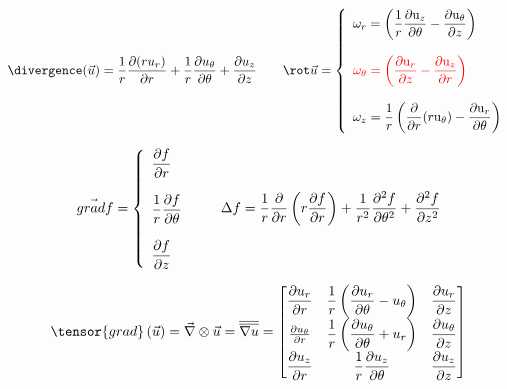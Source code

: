 
$$
\divergence (\vec{u}) = \frac{1}{r} \dpa{(r u_r)}{r} + \frac{1}{r} \dpa{u_{\theta}}{\theta} + \dpa{u_z}{z}\qquad 
\rot \vec{u} =  \left\{ 
\begin{array}{l} 
\displaystyle \omega_r = \left(\frac{1}{r}\frac{\partial \mathrm{u}_z}{\partial \theta} - \frac{\partial \mathrm{u}_\theta}{\partial z}\right) \\ \\
\color{red}{
\displaystyle \omega_\theta = \left(\frac{\partial \mathrm{u}_r}{\partial z} - \frac{\partial \mathrm{u}_z}{\partial r}\right) }
\\ \\
\displaystyle \omega_z = \frac{1}{r}\left(\frac{\partial}{\partial r}(r \mathrm{u}_\theta) - \frac{\partial \mathrm{u}_r}{\partial \theta}\right)\\
\end{array}
\right.
$$

$$
\vec{grad} f = 
 \left\{ 
\begin{array}{l} 
\displaystyle \frac{\partial f}{\partial r} \\ \\
\displaystyle \frac{1}{r} \frac{\partial f}{\partial \theta} \\ \\
\displaystyle \frac{\partial f}{\partial z} \\
\end{array}
\right.
\qquad 
\Delta f = \frac{1}{r} \frac {\partial } {\partial r} \left( r \frac {\partial f} {\partial r} \right) + \frac{1}{r^2}\frac {\partial ^2 f} {\partial \theta^2} + \frac {\partial ^2 f} {\partial z^2}
$$


$$
\displaystyle
\tensor{grad} \left( \vec{u} \right) = \vec{\nabla} \otimes \vec{u}  =\overline{\overline{\nabla u}}=
\begin{bmatrix}
\displaystyle \frac{\partial u_r}{\partial r} & \displaystyle \frac{1}{r} \left( \frac{\partial u_r}{\partial \theta} - u_\theta \right) & \displaystyle \frac{\partial u_r}{\partial z} \\
\frac{\partial u_\theta}{\partial r} & \displaystyle \frac{1}{r} \left( \frac{\partial u_\theta}{\partial \theta} + u_r \right) & \displaystyle \frac{\partial u_\theta}{\partial z} \\
\displaystyle \frac{\partial u_z}{\partial r} & \displaystyle \frac{1}{r} \frac{\partial u_z}{\partial \theta} & \displaystyle \frac{\partial u_z}{\partial z}
\end{bmatrix}
$$

